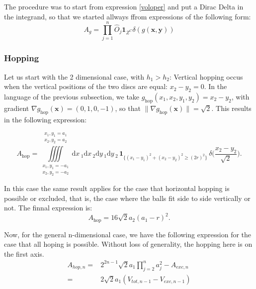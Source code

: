 \documentclass[superscriptaddress,pre,reprint,showpacs,twocolumn]{revtex4-1}
\newcommand{\rd}[1]{\mathrm{d}{#1} \,}
\newcommand{\indicatorsymbol}{\mathbf{1}}
\newcommand{\indicator}[1]{\indicatorsymbol_{ \{   #1 \} } }
\begin{document}
The procedure was to start from expression \eqref{voloper} and put a Dirac Delta
in the integrand, so that we started allways ffrom expressions of the following
form:
\begin{equation}\label{areagral}
A_{g} = \prod_{j=1}^n \hat{O}_j \mathbf{1}_{Z^C} \delta(g(\mathbf{x, y}))
\end{equation}

\subsubsection{Hopping}

Let us start with the 2 dimensional case, with $h_1 > h_2$:
Vertical hopping occus when the vertical positions of the two discs are equal: $x_2 - y_2=0$. In the language of the previous subsection, we take
 $g_\mathrm{hop}(x_1, x_2, y_1, y_2)= x_2 - y_2$, with gradient  $\nabla g_\mathrm{hop}(\mathbf{x}) = (0, 1, 0, -1)$, so that $ \| \nabla g_\mathrm{hop}(\mathbf{x}) \| = \sqrt{2}$. 
This results in the following expression:
\begin{widetext}
\begin{equation}
  A_\text{hop} =
\iiiint
\limits_{\substack{x_1, y_1 = -a_1 \\ x_2, y_2 = -a_2}}^{\substack{x_1, y_1 = a_1 \\ x_2, y_2 = a_2}}
\rd x_1 \rd x_2 \rd y_1 \rd y_2 
 \, \indicator{ (x_1-y_1)^2 + (x_2-y_2)^2 \ge (2r)^2 } \, \delta \big(\frac{x_2-y_2}{\sqrt{2}}\big).
\end{equation}
\end{widetext}
In this case the same result applies for the case that
horizontal hopping is possible or excluded, that is,
the case where the balls fit side to side vertically or not.
The finnal expression is:
 \begin{equation}\label{AreaH}
 A_\text{hop}  =  16 \sqrt{2} a_2(a_1-r)^2.
 \end{equation}

Now, for the general n-dimensional case, we have the following
expression for the case that all hoping is possible.
Without loss of generality, the hopping here is on the first axis.
\begin{equation}
  \begin{split}
    A_{hop,n}  = & 2^{2n-1}\sqrt{2}a_1\prod_{j=2}^n a_j^2-A_{exc,n} \\
      = & 2 \sqrt{2}a_1 (V_{tot,n-1} - V_{exc,n-1})
  \end{split} 
\end{equation}
\end{document}
